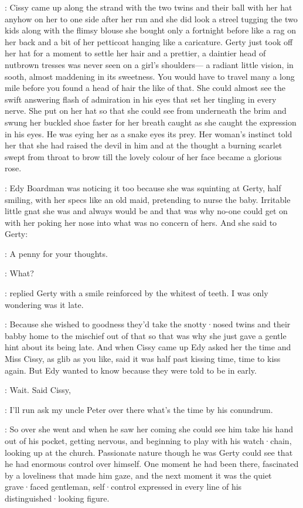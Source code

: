 :
Cissy came up along the strand with the two twins and their ball with
her hat anyhow on her to one side after her run and she did look a streel
tugging the two kids along with the flimsy blouse she bought only a
fortnight before like a rag on her back and a bit of her petticoat hanging
like a caricature.
Gerty just took off her hat for a moment to settle her
hair and a prettier,
a daintier head of nutbrown tresses
was never seen on a girl's shoulders—%
a radiant little vision,
in sooth,
almost maddening in
its sweetness.
You would have to travel many a long mile before you found
a head of hair the like of that.
She could almost see the swift answering
flash of admiration in his eyes that set her tingling in every nerve.
She put on her hat so that she could see from underneath the brim and
swung her buckled shoe faster for her breath caught as she caught the
expression in his eyes.
He was eying her as a snake eyes its prey.
Her
woman's instinct told her that she had raised the devil in him and at the
thought a burning scarlet swept from throat to brow till the lovely colour
of her face became a glorious rose.

:
Edy Boardman was noticing it too because she was squinting at Gerty,
half smiling,
with her specs like an old maid,
pretending to nurse the baby.
Irritable little gnat she was and always would be and that was why
no-one could get on with her poking her nose into what was no concern of hers.
And she said to Gerty:

\edy:
A penny for your thoughts.

\gerty:
What?

:
replied Gerty with a smile reinforced by the whitest of teeth.
I was only wondering was it late.

:
Because she wished to goodness
they'd take the snotty·nosed twins and their babby home
to the mischief out of that
so that was why she just gave a
gentle hint about its being late.
And when Cissy came up Edy asked her the
time and Miss Cissy,
as glib as you like,
said it was half past kissing
time,
time to kiss again.
But Edy wanted to know because they were told to
be in early.

\cissy:
Wait.
Said Cissy,

\cissy:
I'll run ask my uncle Peter over there what's the time
by his conundrum.

:
So over she went and when he saw her coming she could see him take his
hand out of his pocket,
getting nervous,
and beginning to play with his
watch·chain,
looking up at the church.
Passionate nature though he was
Gerty could see that he had enormous control over himself.
One moment
he had been there,
fascinated by a loveliness that made him gaze,
and the next moment
it was the quiet grave·faced gentleman,
self·control expressed
in every line of his distinguished·looking figure.

